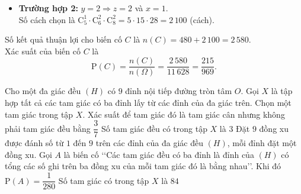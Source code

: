 \begin{ex}
{\begin{itemchoice}
\begin{itemize}
				\item \textbf{Trường hợp 2:} $y=2\Rightarrow z=2$ và $x=1$.\\
				Số cách chọn là $\mathrm{C}_5^1\cdot\mathrm{C}_6^2\cdot\mathrm{C}_8^2=5\cdot 15\cdot 28=2\,100$ (cách).
			\end{itemize}
			Số kết quả thuận lợi cho biến cố $C$ là $n(C)=480+2\,100=2\,580$.\\
			Xác suất của biến cố $C$ là
			\[\mathrm{P}(C)=\dfrac{n(C)}{n(\Omega)}=\dfrac{2\,580}{11\,628}=\dfrac{215}{969}.\]
		\end{itemchoice}
	}
\end{ex}

\begin{ex}%
	Cho một đa giác đều $(H)$ có $9$ đỉnh nội tiếp đường tròn tâm $O$. Gọi $X$ là tập hợp tất cả các tam giác có ba đỉnh lấy từ các đỉnh của đa giác trên.
	\choiceTF
	{Chọn một tam giác trong tập $X$. Xác suất để tam giác đó là tam giác cân nhưng không phải tam giác đều bằng $\dfrac{3}{7}$}
	{\True Số tam giác đều có trong tập $X$ là $3$}
	{Đặt $9$ đồng xu được đánh số từ $1$ đến $9$ trên các đỉnh của đa giác đều $(H)$, mỗi đỉnh đặt một đồng xu. Gọi $A$ là biến cố  \lq\lq Các tam giác đều có ba đỉnh là đỉnh của $(H)$ có tổng các số ghi trên ba đồng xu của mỗi tam giác đó là bằng nhau\rq\rq. Khi đó $\mathrm{P}(A) = \dfrac{1}{280}$}
	{\True Số tam giác có trong tập $X$ là $84$}
\end{ex}
